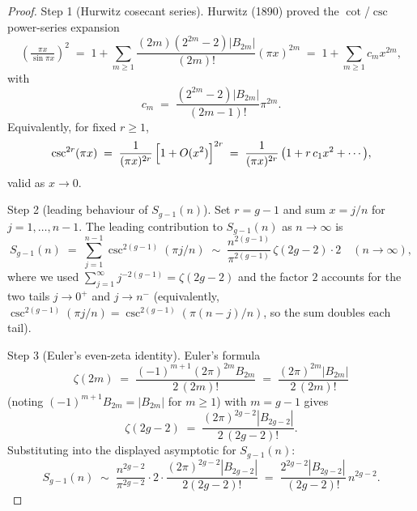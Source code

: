 \begin{proof}
Step 1 (Hurwitz cosecant series). Hurwitz (1890) proved the
$\cot$/$\csc$ power-series expansion
\begin{equation}
\label{eq:hurwitz-csc}
\left(\tfrac{\pi x}{\sin \pi x}\right)^{2}
\;=\; 1 + \sum_{m \ge 1} \frac{(2m)(2^{2m}-2)|B_{2m}|}{(2m)!}(\pi x)^{2m}
\;=\; 1 + \sum_{m\ge 1} c_m x^{2m},
\end{equation}
with
\begin{equation}
c_m \;=\; \frac{(2^{2m}-2)|B_{2m}|}{(2m-1)!}\pi^{2m}.
\end{equation}
Equivalently, for fixed $r \ge 1$,
\begin{equation}
\label{eq:csc-to-bernoulli}
\csc^{2r}(\pi x) \;=\; \frac{1}{(\pi x)^{2r}}\,\Bigl[1 + O(x^2)\Bigr]^{2r}
\;=\; \frac{1}{(\pi x)^{2r}}\,\bigl(1 + r\,c_1 x^2 + \cdots\bigr),
\end{equation}
valid as $x \to 0$.

Step 2 (leading behaviour of $S_{g-1}(n)$). Set $r = g-1$ and sum
$x = j/n$ for $j = 1, \ldots, n-1$. The leading contribution to
$S_{g-1}(n)$ as $n \to \infty$ is
\begin{equation}
\label{eq:s-asymp}
S_{g-1}(n) \;=\; \sum_{j=1}^{n-1} \csc^{2(g-1)}(\pi j/n)
\;\sim\; \frac{n^{2(g-1)}}{\pi^{2(g-1)}}\,\zeta(2g-2)\cdot 2 \quad(n \to \infty),
\end{equation}
where we used $\sum_{j=1}^{\infty} j^{-2(g-1)} = \zeta(2g-2)$ and the factor
$2$ accounts for the two tails $j \to 0^+$ and $j \to n^-$ (equivalently,
$\csc^{2(g-1)}(\pi j/n) = \csc^{2(g-1)}(\pi(n-j)/n)$, so the sum doubles each
tail).

Step 3 (Euler's even-zeta identity). Euler's formula
\begin{equation}
\zeta(2m) \;=\; \frac{(-1)^{m+1}(2\pi)^{2m} B_{2m}}{2\,(2m)!}
\;=\; \frac{(2\pi)^{2m}|B_{2m}|}{2\,(2m)!}
\end{equation}
(noting $(-1)^{m+1}B_{2m} = |B_{2m}|$ for $m \ge 1$) with $m = g-1$ gives
\begin{equation}
\zeta(2g-2) \;=\; \frac{(2\pi)^{2g-2}|B_{2g-2}|}{2\,(2g-2)!}.
\end{equation}
Substituting into the displayed asymptotic for $S_{g-1}(n)$:
\begin{equation}
\label{eq:s-leading}
S_{g-1}(n) \;\sim\; \frac{n^{2g-2}}{\pi^{2g-2}}\cdot 2 \cdot
\frac{(2\pi)^{2g-2}|B_{2g-2}|}{2(2g-2)!}
\;=\; \frac{2^{2g-2}|B_{2g-2}|}{(2g-2)!}\,n^{2g-2}.
\end{equation}


\end{proof}
